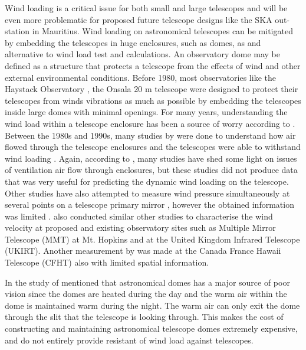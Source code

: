 {Wind loading is a critical issue for both small and large telescopes and will be even more problematic for proposed future telescope designs like the SKA out- station in Mauritius. Wind loading on astronomical telescopes can be mitigated by embedding the telescopes in huge enclosures, such as domes, as and alternative to wind load test and calculations. An observatory dome may be defined as a structure that protects a telescope from the effects of wind and other external environmental conditions.
Before 1980, most observatories like the Haystack Observatory \cite{murga2016design}, the Onsala 20 m telescope\cite{rydbeck1977onsala, shaikh2019band} were designed to protect their telescopes from winds vibrations as much as possible by embedding the telescopes inside large domes with minimal openings. For many years, understanding the wind load within a telescope enclosure has been a source of worry according to  \cite{macmynowski2006wind}. Between the 1980s and 1990s, many studies by \cite{forbes1982wind,forbes1984large} were done to understand how air flowed through the telescope enclosures and the telescopes were able to withstand wind loading \cite{cho2003wind}.  Again, according to \cite{cho2003wind}, many studies have shed some light on issues of ventilation air flow through enclosures, but these studies did not produce data that was very useful for predicting the dynamic wind loading on the telescope.
Other studies have also attempted to measure wind pressure simultaneously at several points on a telescope primary mirror \cite{forbes1982wind,forbes1984large}, however the obtained information was limited \cite{cho2003wind}.
\cite{forbes1982wind} also conducted similar other studies to characterise the wind velocity at proposed and existing observatory sites such as Multiple Mirror Telescope (MMT) at Mt. Hopkins and at the United Kingdom Infrared Telescope (UKIRT). Another measurement by \cite{itoh1990mechanical} was made  at the Canada France Hawaii Telescope (CFHT) also with limited  spatial information.

In the study of \cite{perez2010telescope} mentioned that astronomical domes has a major source of poor vision since the domes are heated during the day and the warm air within the dome is maintained warm during the night. The warm air can only exit the dome through the slit that the telescope is looking through. This makes the cost of constructing and maintaining astronomical telescope domes extremely expensive, and do not entirely provide resistant  of wind load against telescopes. 

}
